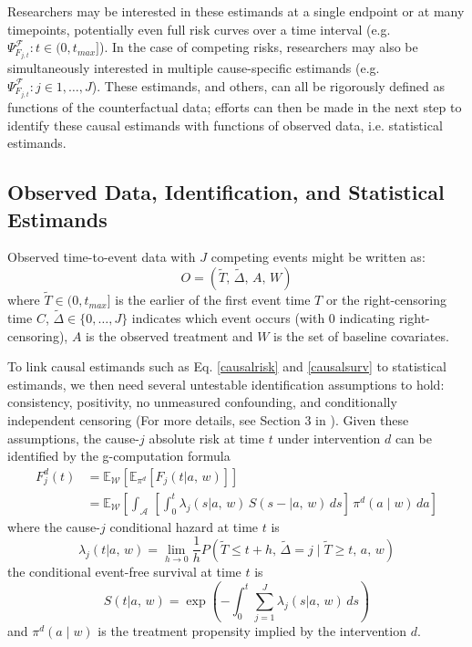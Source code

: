 \documentclass{report}
\newcommand{\1}{\ensuremath{\mathbf{1}}}
\newcommand{\T}{\ensuremath{\widetilde{T}}}
\newcommand{\ax}{\ensuremath{\mid a,\,{w}}}
\newcommand{\x}{\ensuremath{{w}}}
\newcommand{\g}{\ensuremath{\pi}}
\renewcommand{\L}{\ensuremath{W}}
\renewcommand{\l}{\ensuremath{w}}
\newcommand{\tDelta}{\ensuremath{\widetilde{\Delta}}}
\newcommand{\F}{\ensuremath{\mathcal{F}}}
\begin{document}
Researchers may be interested in these estimands at a single endpoint or at many timepoints, potentially even full risk curves over a time interval (e.g. \(\Psi^\F_{F_{j,t}} : t \in (0, t_{max}]\)). In the case of competing risks, researchers may also be simultaneously interested in multiple cause-specific estimands (e.g. \(\Psi^\F_{F_{j,t}} : j \in 1, \dots, J\)). These estimands, and others, can all be rigorously defined as functions of the counterfactual data; efforts can then be made in the next step to identify these causal estimands with functions of observed data, i.e. statistical estimands.

\subsection{Observed Data, Identification, and Statistical Estimands}
\label{ObservedData}
Observed time-to-event data with \(J\) competing events might be written as:
\begin{equation}
 O = \left(\T,\, \tDelta,\, A,\, \L \right) \label{obs-data}
\end{equation}
where \(\T \in (0, t_{max}]\) is the earlier of the first event time \(T\) or the right-censoring time \(C\), \(\tDelta \in \{0, \dots, J\}\) indicates which event occurs (with 0 indicating right-censoring), \(A\) is the observed treatment and \(\L\) is the set of baseline covariates.

To link causal estimands such as Eq. \eqref{causalrisk} and \eqref{causalsurv} to statistical estimands, we then need several untestable identification assumptions to hold: consistency, positivity, no unmeasured confounding, and conditionally independent censoring (For more details, see Section 3 in \cite{rytgaard_continuous-time_2021}). Given these assumptions, the cause-\(j\) absolute risk at time \(t\) under intervention \(d\) can be identified by the g-computation formula
\begin{align}
F^d_j(t) &= \mathbb{E}_{\mathcal{\L}} \left[ \mathbb{E}_{\g^d} \left[{ F_j(t \ax)} \right] \right] \nonumber \\
&= \mathbb{E}_{\mathcal{\L}} \left[ \int_{\mathcal{A}} \,  \left[{ \int_0^t \lambda_j(s \ax) \, S(s- \ax) \, ds }\right] \, \g^d (a \mid \l) \, da \right] \label{absrisk}
\end{align}
where the cause-\(j\) conditional hazard at time \(t\) is
\begin{equation*}
\lambda_j(t \ax) = \lim\limits_{h \to 0} \frac{1}{h} P(\T \leq t + h,\, \tDelta = j \mid \T \geq t,\, a,\, \x) 
\end{equation*}
the conditional event-free survival at time \(t\) is 
\begin{equation*}
S(t \ax) = \exp\left(-\int^{t}_{0} \sum\limits_{j=1}^{J} \lambda_j(s \ax) \, ds \right)
\end{equation*}
and \(\g^d(a \mid \l)\) is the treatment propensity implied by the intervention \(d\).
\end{document}
